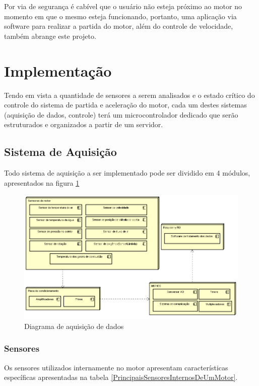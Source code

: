 Por via de segurança é cabível que o usuário não esteja próximo ao motor no momento em que o mesmo esteja funcionando, portanto, uma aplicação via software para realizar a partida do motor, além do controle de velocidade, também abrange este projeto.

\section{Implementação}

Tendo em vista a quantidade de sensores a serem analisados e o estado crítico do controle do sistema de partida e aceleração do motor, cada um destes sistemas (aquisição de dados, controle) terá um microcontrolador dedicado que serão estruturados e organizados a partir de um servidor.

\subsection{Sistema de Aquisição}

Todo sistema de aquisição a ser implementado pode ser dividido em 4 módulos, apresentados na figura \ref{diagramaDeAquisicaoDeDados}

\begin{figure}[h!]
	\centering
	\includegraphics[keepaspectratio=true,scale= 0.7]{figuras/Diagrama.PNG}
	\caption{Diagrama de aquisição de dados}
	\label{diagramaDeAquisicaoDeDados}
\end{figure}

\subsubsection{Sensores}

Os sensores utilizados internamente no motor apresentam características específicas apresentadas na tabela \ref{PrincipaisSensoresInternosDeUmMotor}.

